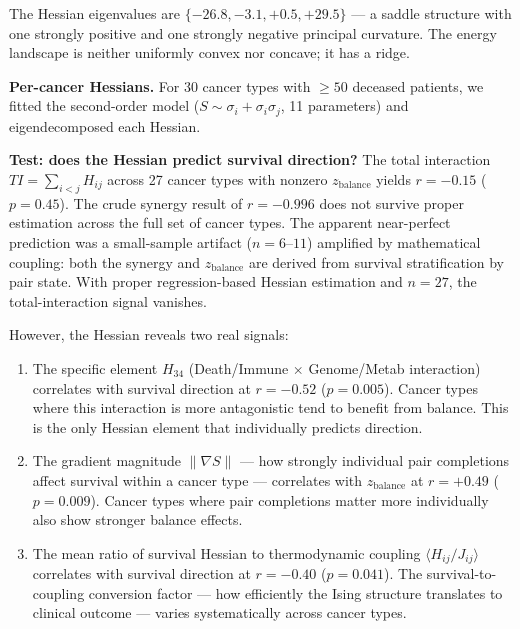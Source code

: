 \documentclass[
  11pt,
]{article}
\begin{document}
The Hessian eigenvalues are \(\{-26.8, -3.1, +0.5, +29.5\}\) --- a
saddle structure with one strongly positive and one strongly negative
principal curvature. The energy landscape is neither uniformly convex
nor concave; it has a ridge.

\textbf{Per-cancer Hessians.} For 30 cancer types with \(\geq 50\)
deceased patients, we fitted the second-order model
(\(S \sim \sigma_i + \sigma_i \sigma_j\), 11 parameters) and
eigendecomposed each Hessian.

\textbf{Test: does the Hessian predict survival direction?} The total
interaction \(TI = \sum_{i < j} H_{ij}\) across 27 cancer types with
nonzero \(z_\mathrm{balance}\) yields \(r = -0.15\) (\(p = 0.45\)). The
crude synergy result of \(r = -0.996\) does not survive proper
estimation across the full set of cancer types. The apparent
near-perfect prediction was a small-sample artifact (\(n = 6\)--\(11\))
amplified by mathematical coupling: both the synergy and
\(z_\mathrm{balance}\) are derived from survival stratification by pair
state. With proper regression-based Hessian estimation and \(n = 27\),
the total-interaction signal vanishes.

However, the Hessian reveals two real signals:

\begin{enumerate}
\def\labelenumi{\arabic{enumi}.}
\item
  The specific element \(H_{34}\) (Death/Immune \(\times\) Genome/Metab
  interaction) correlates with survival direction at \(r = -0.52\)
  (\(p = 0.005\)). Cancer types where this interaction is more
  antagonistic tend to benefit from balance. This is the only Hessian
  element that individually predicts direction.
\item
  The gradient magnitude \(\|\nabla S\|\) --- how strongly individual
  pair completions affect survival within a cancer type --- correlates
  with \(z_\mathrm{balance}\) at \(r = +0.49\) (\(p = 0.009\)). Cancer
  types where pair completions matter more individually also show
  stronger balance effects.
\item
  The mean ratio of survival Hessian to thermodynamic coupling
  \(\langle H_{ij} / J_{ij} \rangle\) correlates with survival direction
  at \(r = -0.40\) (\(p = 0.041\)). The survival-to-coupling conversion
  factor --- how efficiently the Ising structure translates to clinical
  outcome --- varies systematically across cancer types.
\end{enumerate}
\end{document}
